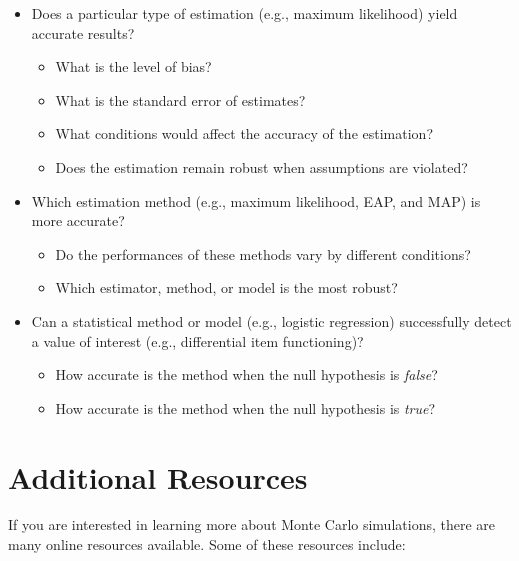 \documentclass[
]{book}
\providecommand{\tightlist}{%
  \setlength{\itemsep}{0pt}\setlength{\parskip}{0pt}}
\begin{document}
\begin{itemize}
\tightlist
\item
  Does a particular type of estimation (e.g., maximum likelihood) yield accurate results?

  \begin{itemize}
  \tightlist
  \item
    What is the level of bias?
  \item
    What is the standard error of estimates?
  \item
    What conditions would affect the accuracy of the estimation?
  \item
    Does the estimation remain robust when assumptions are violated?
  \end{itemize}
\item
  Which estimation method (e.g., maximum likelihood, EAP, and MAP) is more accurate?

  \begin{itemize}
  \tightlist
  \item
    Do the performances of these methods vary by different conditions?
  \item
    Which estimator, method, or model is the most robust?
  \end{itemize}
\item
  Can a statistical method or model (e.g., logistic regression) successfully detect a value of interest (e.g., differential item functioning)?

  \begin{itemize}
  \tightlist
  \item
    How accurate is the method when the null hypothesis is \emph{false}?
  \item
    How accurate is the method when the null hypothesis is \emph{true}?
  \end{itemize}
\end{itemize}

\hypertarget{additional-resources}{%
\section{Additional Resources}\label{additional-resources}}

If you are interested in learning more about Monte Carlo simulations, there are many online resources available. Some of these resources include:
\end{document}
